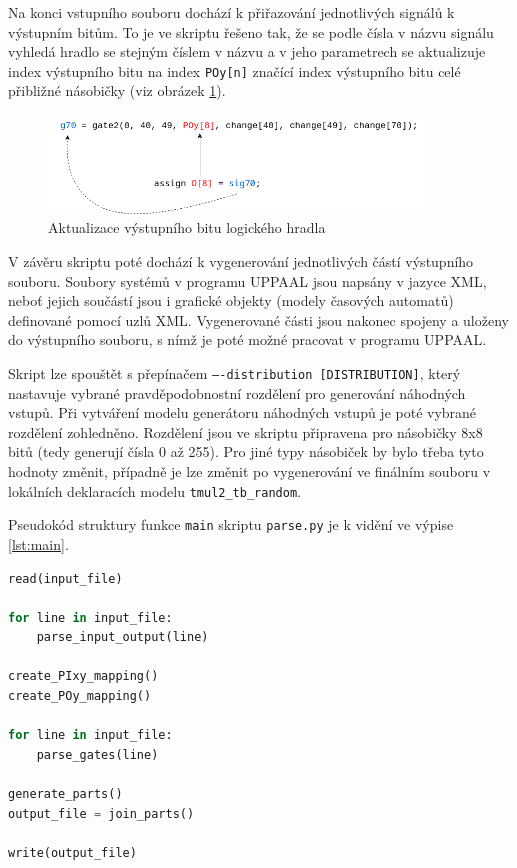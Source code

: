 Na konci vstupního souboru dochází k přiřazování jednotlivých signálů k výstupním bitům. To je ve skriptu řešeno tak, že se podle čísla v názvu signálu vyhledá hradlo se stejným číslem v názvu a v jeho parametrech se aktualizuje index výstupního bitu na index \texttt{POy[n]} značící index výstupního bitu celé přibližné násobičky (viz obrázek \ref{fig:gate_output}).

\begin{figure}[H]
    \centering
    \includegraphics[width=0.9\textwidth]{obrazky-figures/gate_output.png}
    \caption{Aktualizace výstupního bitu logického hradla}
    \label{fig:gate_output}
\end{figure}

V závěru skriptu poté dochází k vygenerování jednotlivých částí výstupního souboru. Soubory systémů v programu UPPAAL jsou napsány v jazyce XML, neboť jejich součástí jsou i grafické objekty (modely časových automatů) definované pomocí uzlů XML. Vygenerované části jsou nakonec spojeny a uloženy do výstupního souboru, s nímž je poté možné pracovat v programu UPPAAL.

Skript lze spouštět s přepínačem \texttt{----distribution [DISTRIBUTION]}, který nastavuje vybrané pravděpodobnostní rozdělení pro generování náhodných vstupů. Při vytváření modelu generátoru náhodných vstupů je poté vybrané rozdělení zohledněno. Rozdělení jsou ve skriptu připravena pro násobičky 8x8 bitů (tedy generují čísla 0 až 255). Pro jiné typy násobiček by bylo třeba tyto hodnoty změnit, případně je lze změnit po vygenerování ve finálním souboru v lokálních deklaracích modelu \texttt{tmul2\_tb\_random}.

Pseudokód struktury funkce \texttt{main} skriptu \texttt{parse.py} je k vidění ve výpise \ref{lst:main}.

\begin{lstlisting}[language={Python}, caption={Pseudokód hlavní části skriptu parse.py}, label={lst:main}]
read(input_file)

for line in input_file:
    parse_input_output(line)

create_PIxy_mapping()
create_POy_mapping()

for line in input_file:
    parse_gates(line)

generate_parts()
output_file = join_parts()

write(output_file)
\end{lstlisting}


